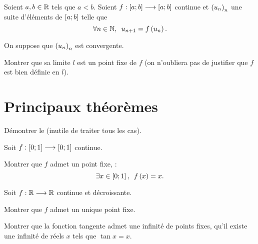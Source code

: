 \begin{corr}
\end{corr}

\begin{exo}[Exercice 8]
Soient \(a,b\in\mathbb{R}\) tels que \(a<b\). Soient \(f:\left[a;b\right]\longrightarrow\left[a;b\right]\) continue et \(\left(u_n\right)_n\) une suite d'éléments de \(\left[a;b\right]\) telle que \[\quantifs{\forall n\in\N}u_{n+1}=f\paren{u_n}.\]

On suppose que \(\left(u_n\right)_n\) est convergente.

Montrer que sa limite \(l\) est un point fixe de \(f\) (on n'oubliera pas de justifier que \(f\) est bien définie en \(l\)).
\end{exo}

\begin{corr}
\end{corr}

\section{Principaux théorèmes}

\begin{exo}[Exercice 9]
Démontrer le  (inutile de traiter tous les cas).
\end{exo}

\begin{corr}
\end{corr}

\begin{exo}
Soit \(f:\left[0;1\right]\longrightarrow\left[0;1\right]\) continue.

Montrer que \(f\) admet un point fixe, \cad : \[\quantifs{\exists x\in\intervii{0}{1}}f\paren{x}=x.\]
\end{exo}

\begin{corr}
\end{corr}

\begin{exo}[Exercice 11]
Soit \(f:\mathbb{R}\longrightarrow\mathbb{R}\) continue et décroissante.

Montrer que \(f\) admet un unique point fixe.
\end{exo}

\begin{corr}
\end{corr}

\begin{exo}[Exercice 12]
Montrer que la fonction tangente admet une infinité de points fixes, \cad qu'il existe une infinité de réels \(x\) tels que \(\tan x=x\).
\end{exo}

